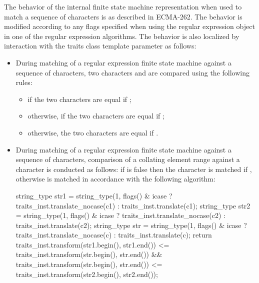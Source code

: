 \pnum
{}%
The behavior of the internal finite state machine representation when used to match a
sequence of characters is as described in ECMA-262.
The behavior is modified according
to any  flags specified when using the regular expression
object in one of the regular expression algorithms. The behavior is also
localized by interaction with the traits class template parameter as follows:
\begin{itemize}
\item During matching of a regular expression finite state machine
against a sequence of characters, two characters 
and  are compared using the following rules:
\begin{itemize}
\item if  the two characters are equal
if ;
%
%
\item otherwise, if  the
two characters are equal if
;
%
%
%
\item otherwise, the two characters are equal if .
\end{itemize}

\item During matching of a regular expression finite state machine
against a sequence of characters, comparison of a collating element
range  against a character  is
conducted as follows: if 
is false then the character  is matched if , otherwise  is matched in
accordance with the following algorithm:

%
%
%
%
%
%
\begin{codeblock}
string_type str1 = string_type(1,
  flags() & icase ?
    traits_inst.translate_nocase(c1) : traits_inst.translate(c1);
string_type str2 = string_type(1,
  flags() & icase ?
    traits_inst.translate_nocase(c2) : traits_inst.translate(c2);
string_type str = string_type(1,
  flags() & icase ?
    traits_inst.translate_nocase(c) : traits_inst.translate(c);
return traits_inst.transform(str1.begin(), str1.end())
      <= traits_inst.transform(str.begin(), str.end())
  && traits_inst.transform(str.begin(), str.end())
      <= traits_inst.transform(str2.begin(), str2.end());
\end{codeblock}


\end{itemize}
